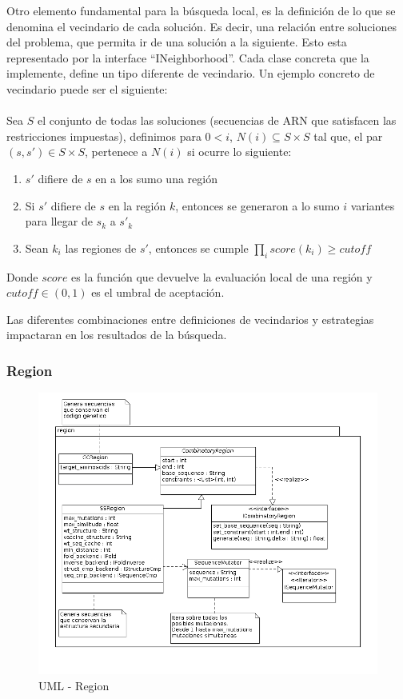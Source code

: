   Otro elemento fundamental para la b\'usqueda local, es la definici\'on de lo
que se denomina el vecindario de cada soluci\'on. Es decir, una relaci\'on entre
soluciones del problema, que permita ir de una soluci\'on a la siguiente. Esto
esta representado por la interface ``INeighborhood''. Cada clase concreta que
la implemente, define un tipo diferente de vecindario. Un ejemplo concreto de
vecindario puede ser el siguiente:
\\\\
  Sea $S$ el conjunto de todas las soluciones (secuencias de ARN que
satisfacen las restricciones impuestas), definimos para $0<i$, $N(i) \subseteq S
\times S$ tal que, el par $(s,s') \in S\times S$, pertenece a $N(i)$ si ocurre
lo siguiente:
\begin{enumerate}
 \item $s'$ difiere de $s$ en a los sumo una regi\'on
 \item Si $s'$ difiere de $s$ en la regi\'on $k$, entonces se generaron a lo
sumo $i$ variantes para llegar de $s_{k}$ a $s'_{k}$
 \item Sean $k_{i}$ las regiones de $s'$, entonces se cumple $\prod_{i}
score(k_{i}) \ge cutoff$
\end{enumerate}

Donde $score$ es la funci\'on que devuelve la evaluaci\'on local de una
regi\'on y $cutoff \in (0,1)$ es el umbral de aceptaci\'on.

Las diferentes combinaciones entre definiciones de vecindarios y estrategias
impactaran en los resultados de la b\'usqueda.

  \subsubsection{Region}   
    \begin{figure}
      \centering
      \includegraphics[scale=0.5]{lld-regions.png}  
      \caption{UML - Region}
      \label{uml:lld-regions}
    \end{figure}

